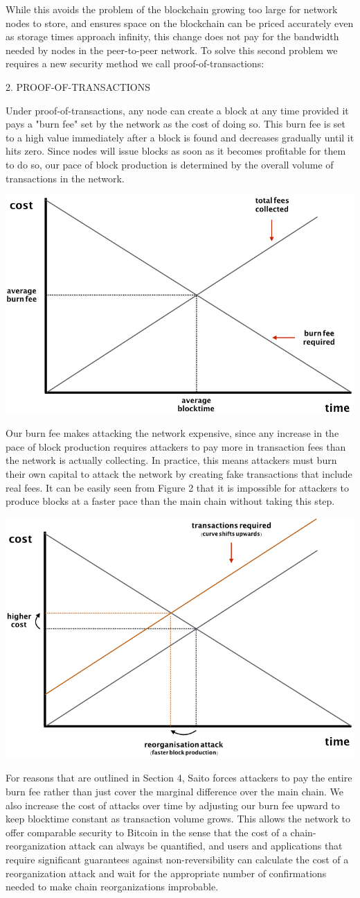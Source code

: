 \documentclass[12pt, oneside]{article}   	%
\begin{document}
\begin{multicols}{2}
While this avoids the problem of the blockchain growing too large for network nodes to store, and ensures space on the blockchain can be priced accurately even as storage times approach infinity, this change does not pay for the bandwidth needed by nodes in the peer-to-peer network. To solve this second problem we requires a new security method we call proof-of-transactions:

2. PROOF-OF-TRANSACTIONS

Under proof-of-transactions, any node can create a block at any time provided it pays a "burn fee" set by the network as the cost of doing so. This burn fee is set to a high value immediately after a block is found and decreases gradually until it hits zero. Since nodes will issue blocks as soon as it becomes profitable for them to do so, our pace of block production is determined by the overall volume of transactions in the network.

\includegraphics[width=.45\textwidth]{saito2.jpeg}

Our burn fee makes attacking the network expensive, since any increase in the pace of block production requires attackers to pay more in transaction fees than the network is actually collecting. In practice, this means attackers must burn their own capital to attack the network by creating fake transactions that include real fees. It can be easily seen from Figure 2 that it is impossible for attackers to produce blocks at a faster pace than the main chain without taking this step.

\includegraphics[width=.45\textwidth]{saito3.jpeg}

For reasons that are outlined in Section 4, Saito forces attackers to pay the entire burn fee rather than just cover the marginal difference over the main chain. We also increase the cost of attacks over time by adjusting our burn fee upward to keep blocktime constant as transaction volume grows. This allows the network to offer comparable security to Bitcoin in the sense that the cost of a chain-reorganization attack can always be quantified, and users and applications that require significant guarantees against non-reversibility can calculate the cost of a reorganization attack and wait for the appropriate number of confirmations needed to make chain reorganizations improbable.


\end{multicols}
\end{document}
